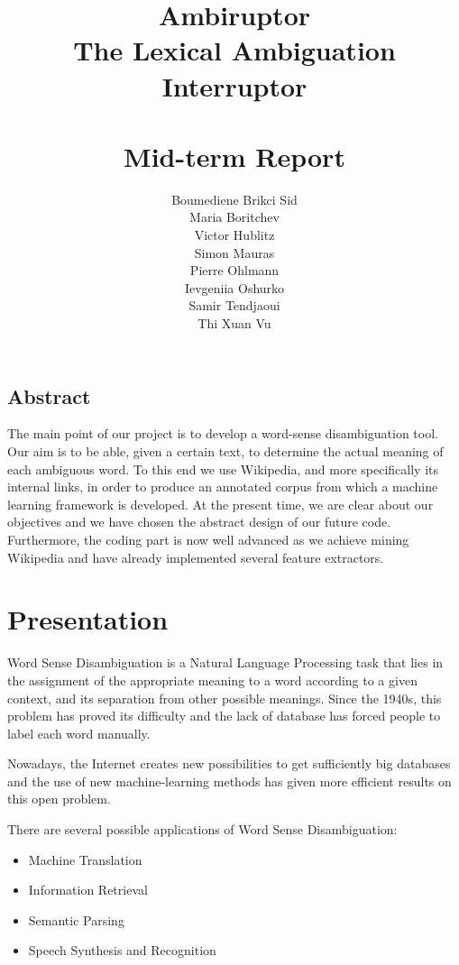 \documentclass[11pt,a4paper]{article}
\title{\textbf{Ambiruptor}\\The Lexical Ambiguation
    Interruptor\\~\\Mid-term Report}
\author{Boumediene Brikci Sid\\
         Maria Boritchev\\
         Victor Hublitz\\
         Simon Mauras\\
         Pierre Ohlmann\\
         Ievgeniia Oshurko\\
         Samir Tendjaoui\\
         Thi Xuan Vu}
\begin{document}
\maketitle

\vspace{2cm}
\subsection*{Abstract} 

The main point of our project is to develop a word-sense disambiguation tool. Our aim is to be able, given a certain text, to determine the actual meaning of each ambiguous word. To this end we use Wikipedia, and more specifically its internal links, in order to produce an annotated corpus from which a machine learning framework is developed. At the present time, we are clear about our objectives and we have chosen the abstract design of our future code. Furthermore, the coding part is now well advanced as we achieve mining Wikipedia and have already implemented several feature extractors.

\newpage

\tableofcontents

\newpage

\section{Presentation}

Word Sense Disambiguation is a Natural Language Processing task that lies in the assignment of the appropriate meaning to a word according to a given context, and its separation from other possible meanings. Since the 1940s, this problem has proved its difficulty and the lack of database has forced people to label each word manually.

Nowadays, the Internet creates new possibilities to get sufficiently big databases and the use of new machine-learning methods has given more efficient results on this open problem.    


\noindent There are several possible applications of Word Sense Disambiguation:
\begin{itemize}
	\item Machine Translation
	\item Information Retrieval
	\item Semantic Parsing
	\item Speech Synthesis and Recognition
\end{itemize}
\end{document}
